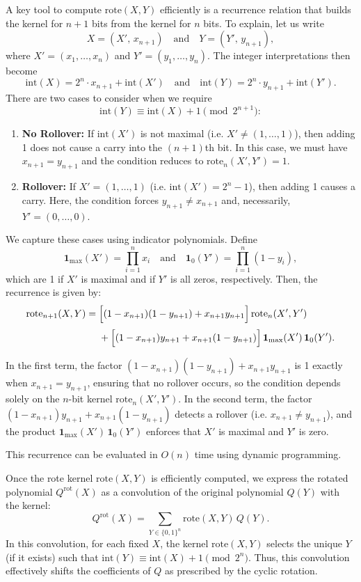 \documentclass{article}
\begin{document}
A key tool to compute \(\text{rote}(X,Y)\) efficiently is a recurrence relation that builds the kernel for \(n+1\) bits from the kernel for \(n\) bits. To explain, let us write 
\[
X=(X',\,x_{n+1})\quad \text{and}\quad Y=(Y',\,y_{n+1}),
\]
where \(X'=(x_1,\dots,x_n)\) and \(Y'=(y_1,\dots,y_n)\). The integer interpretations then become
\[
\text{int}(X)=2^n \cdot x_{n+1}+\text{int}(X')\quad \text{and}\quad \text{int}(Y)=2^n \cdot y_{n+1}+\text{int}(Y').
\]
There are two cases to consider when we require
\[
\text{int}(Y) \equiv \text{int}(X)+1 \pmod{2^{n+1}}:
\]
\begin{enumerate}
    \item \textbf{No Rollover:} If \(\text{int}(X')\) is not maximal (i.e. \(X' \neq (1,\dots,1)\)), then adding 1 does not cause a carry into the \((n+1)\)th bit. In this case, we must have \(x_{n+1}=y_{n+1}\) and the condition reduces to \(\text{rote}_n(X',Y')=1\).
    \item \textbf{Rollover:} If \(X'=(1,\dots,1)\) (i.e. \(\text{int}(X')=2^n-1\)), then adding 1 causes a carry. Here, the condition forces \(y_{n+1}\neq x_{n+1}\) and, necessarily, \(Y'=(0,\dots,0)\).
\end{enumerate}
We capture these cases using indicator polynomials. Define
\[
\mathbf{1}_{\max}(X') = \prod_{i=1}^n x_i \quad \text{and} \quad \mathbf{1}_{0}(Y') = \prod_{i=1}^n (1-y_i),
\]
which are 1 if \(X'\) is maximal and if \(Y'\) is all zeros, respectively. Then, the recurrence is given by:
\[
\begin{aligned}
\text{rote}_{n+1}(X,Y) =\; &\Bigl[(1-x_{n+1})(1-y_{n+1}) + x_{n+1}y_{n+1}\Bigr]\,\text{rote}_n(X',Y')\\[1mm]
&+ \Bigl[(1-x_{n+1})y_{n+1} + x_{n+1}(1-y_{n+1})\Bigr]\,\mathbf{1}_{\max}(X')\,\mathbf{1}_{0}(Y').
\end{aligned}
\]

In the first term, the factor \((1-x_{n+1})(1-y_{n+1}) + x_{n+1}y_{n+1}\) is 1 exactly when \(x_{n+1}=y_{n+1}\), ensuring that no rollover occurs, so the condition depends solely on the \(n\)-bit kernel \(\text{rote}_n(X',Y')\). In the second term, the factor \((1-x_{n+1})y_{n+1} + x_{n+1}(1-y_{n+1})\) detects a rollover (i.e. \(x_{n+1}\neq y_{n+1}\)), and the product \(\mathbf{1}_{\max}(X')\,\mathbf{1}_{0}(Y')\) enforces that \(X'\) is maximal and \(Y'\) is zero.

This recurrence can be evaluated in \(O(n)\) time using dynamic programming. 

Once the rote kernel \(\text{rote}(X,Y)\) is efficiently computed, we express the rotated polynomial \(Q^{\text{rot}}(X)\) as a convolution of the original polynomial \(Q(Y)\) with the kernel:
\[
Q^{\text{rot}}(X) = \sum_{Y \in \{0,1\}^n} \text{rote}(X,Y)\, Q(Y).
\]
In this convolution, for each fixed \(X\), the kernel \(\text{rote}(X,Y)\) selects the unique \(Y\) (if it exists) such that \(\text{int}(Y) \equiv \text{int}(X)+1 \pmod{2^n}\). Thus, this convolution effectively shifts the coefficients of \(Q\) as prescribed by the cyclic rotation. 
\end{document}
